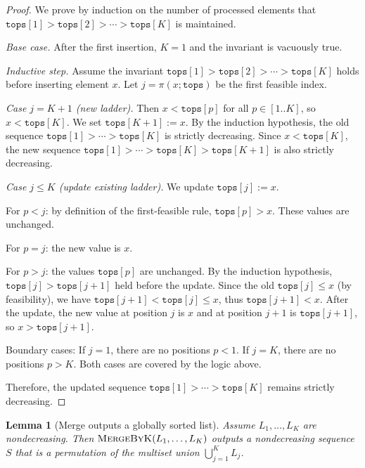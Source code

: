 \documentclass[12pt,a4paper]{article}
\theoremstyle{plain}
\newtheorem{lemma}[theorem]{Lemma}
\theoremstyle{definition}
\newcommand{\tops}{\texttt{tops}}
\begin{document}
\begin{proof}
We prove by induction on the number of processed elements that
$\tops[1] > \tops[2] > \cdots > \tops[K]$ is maintained.

\emph{Base case.} After the first insertion, $K=1$ and the invariant is vacuously true.

\emph{Inductive step.} Assume the invariant $\tops[1] > \tops[2] > \cdots > \tops[K]$ holds
before inserting element $x$. Let $j = \pi(x; \tops)$ be the first feasible index.

\textit{Case $j = K+1$ (new ladder).}
Then $x < \tops[p]$ for all $p \in [1..K]$, so $x < \tops[K]$.
We set $\tops[K+1] := x$. By the induction hypothesis, the old sequence
$\tops[1] > \cdots > \tops[K]$ is strictly decreasing. Since $x < \tops[K]$,
the new sequence $\tops[1] > \cdots > \tops[K] > \tops[K+1]$ is also strictly decreasing.

\textit{Case $j \le K$ (update existing ladder).}
We update $\tops[j] := x$.

For $p < j$: by definition of the first-feasible rule, $\tops[p] > x$. These values are unchanged.

For $p = j$: the new value is $x$.

For $p > j$: the values $\tops[p]$ are unchanged. By the induction hypothesis,
$\tops[j] > \tops[j+1]$ held before the update. Since the old $\tops[j] \le x$
(by feasibility), we have $\tops[j+1] < \tops[j] \le x$, thus $\tops[j+1] < x$.
After the update, the new value at position $j$ is $x$ and at position $j+1$ is $\tops[j+1]$,
so $x > \tops[j+1]$.

Boundary cases: If $j=1$, there are no positions $p<1$. If $j=K$, there are no positions $p>K$.
Both cases are covered by the logic above.

Therefore, the updated sequence $\tops[1] > \cdots > \tops[K]$ remains strictly decreasing.
\end{proof}

\begin{lemma}[Merge outputs a globally sorted list]
\label{lem:merge_sorted}
Assume $L_1, \dots, L_K$ are nondecreasing.  Then
$\textsc{MergeByK}(L_1, \dots, L_K)$ outputs a nondecreasing sequence $S$
that is a permutation of the multiset union $\bigcup_{j=1}^K L_j$.
\end{lemma}
\end{document}
